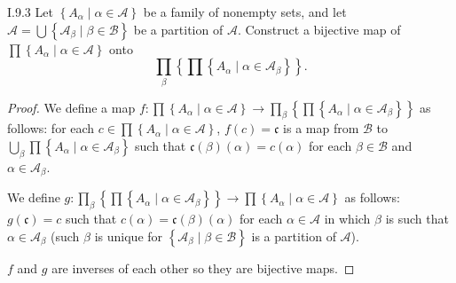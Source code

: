 \begin{problem}{I.9.3}
Let \( \left\{ A_{\alpha} \mid \alpha \in \mathscr{A} \right\} \) be a family of nonempty sets, and let \( \mathscr{A} = \bigcup\left\{ \mathscr{A}_{\beta} \mid \beta \in \mathscr{B} \right\} \) be a partition of \( \mathscr{A} \). Construct a bijective map of \( \prod\left\{ A_{\alpha} \mid \alpha \in \mathscr{A} \right\} \) onto
\[
	\prod_{\beta} \left\{ \prod\left\{ A_{\alpha} \mid \alpha \in \mathscr{A}_{\beta} \right\} \right\}.
\]
\end{problem}

\begin{proof}
	We define a map \( f: \prod\left\{ A_{\alpha} \mid \alpha \in \mathscr{A} \right\} \to \prod_{\beta} \left\{ \prod\left\{ A_{\alpha} \mid \alpha \in \mathscr{A}_{\beta} \right\} \right\} \) as follows: for each \( c \in \prod\left\{ A_{\alpha} \mid \alpha \in \mathscr{A} \right\} \), \( f(c) = \mathfrak{c} \) is a map from \( \mathscr{B} \) to \( \bigcup_{\beta} \prod\left\{ A_{\alpha} \mid \alpha \in \mathscr{A}_{\beta} \right\} \) such that \( \mathfrak{c}(\beta)(\alpha) = c(\alpha) \) for each \( \beta \in \mathscr{B} \) and \( \alpha \in \mathscr{A}_{\beta} \).

	We define \( g: \prod_{\beta} \left\{ \prod \left\{ A_{\alpha} \mid \alpha \in \mathscr{A}_{\beta} \right\} \right\} \to \prod\left\{ A_{\alpha} \mid \alpha \in \mathscr{A} \right\} \) as follows: \( g(\mathfrak{c}) = c \) such that \( c(\alpha) = \mathfrak{c}(\beta)(\alpha) \) for each \( \alpha \in \mathscr{A} \) in which \( \beta \) is such that \( \alpha \in \mathscr{A}_{\beta} \) (such \( \beta \) is unique for \( \left\{ \mathscr{A}_{\beta} \mid \beta \in \mathscr{B} \right\} \) is a partition of \( \mathscr{A} \)).

	\( f \) and \( g \) are inverses of each other so they are bijective maps.
\end{proof}
